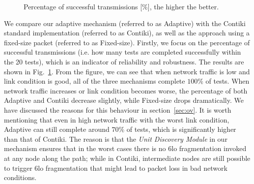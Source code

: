 \documentclass[runningheads,a4paper]{llncs}
\begin{document}
\begin{figure}
	\vspace{-15pt}
	\centering
	\caption{Percentage of successful transmissions [$\%$], the higher the better.}
	\label{fig:pct}
	\vspace{-15pt}
\end{figure}

We compare our adaptive mechanism (referred to as Adaptive) with the Contiki standard implementation (referred to as Contiki), as well as the approach using a fixed-size packet (referred to as Fixed-size). Firstly, we focus on the percentage of successful transmissions (i.e. how many tests are completed successfully within the 20 tests), which is an indicator of reliability and robustness. The results are shown in Fig.~\ref{fig:pct}. From the figure, we can see that when network traffic is low and link condition is good, all of the three mechanisms complete $100\%$ of tests. When network traffic increases or link condition becomes worse, the percentage of both Adaptive and Contiki decrease slightly, while Fixed-size drops dramatically. We have discussed the reasons for this behaviour in section~\ref{sec:ov}. It is worth mentioning that even in high network traffic with the worst link condition, Adaptive can still complete around $70\%$ of tests, which is significantly higher than that of Contiki. The reason is that the \emph{Unit Discovery Module} in our mechanism ensures that in the worst cases there is no 6lo fragmentation invoked at any node along the path; while in Contiki, intermediate nodes are still possible to trigger 6lo fragmentation that might lead to packet loss in bad network conditions.
\end{document}
